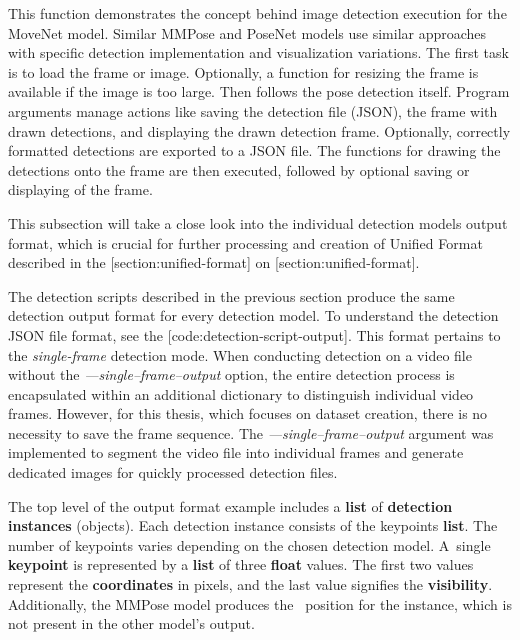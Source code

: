 
This function demonstrates the concept behind image detection execution for the MoveNet model. Similar MMPose and PoseNet models use similar approaches with specific detection implementation and visualization variations. The first task is to load the frame or image. Optionally, a function for resizing the frame is available if the image is too large. Then follows the pose detection itself. Program arguments manage actions like saving the detection file (JSON), the frame with drawn detections, and displaying the drawn detection frame. Optionally, correctly formatted detections are exported to a JSON file. The functions for drawing the detections onto the frame are then executed, followed by optional saving or displaying of the frame. 


This subsection will take a close look into the individual detection models output format, which is crucial for further processing and creation of Unified Format described in the [section:unified-format] on [section:unified-format].

The detection scripts described in the previous section produce the same detection output format for every detection model. To understand the detection JSON file format, see the [code:detection-script-output]. This format pertains to the {\em single-frame} detection mode. When conducting detection on a video file without the {\em ---single--frame--output} option, the entire detection process is encapsulated within an additional dictionary to distinguish individual video frames. However, for this thesis, which focuses on dataset creation, there is no necessity to save the frame sequence. The {\em---single--frame--output} argument was implemented to segment the video file into individual frames and generate dedicated images for quickly processed detection files.


The top level of the output format example includes a {\bf list} of {\bf detection instances} (objects). Each detection instance consists of the keypoints {\bf list}. The number of keypoints varies depending on the chosen detection model. A~single {\bf keypoint} is represented by a {\bf list} of three {\bf float} values. The first two values represent the {\bf coordinates} in pixels, and the last value signifies the {\bf visibility}. Additionally, the MMPose model produces the \BBOX\ position for the instance, which is not present in the other model's output.

